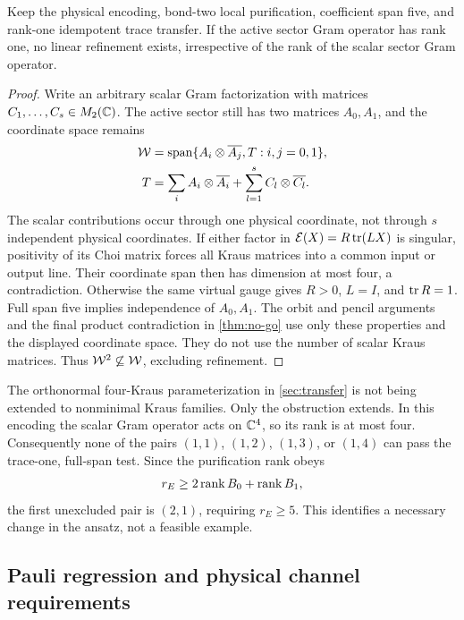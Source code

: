 \begin{corollary}
	\label{cor:scalar-extension}
	Keep the physical encoding, bond-two local purification, coefficient span
	five, and rank-one idempotent trace transfer. If the active sector Gram
	operator has rank one, no linear refinement exists, irrespective of the
	rank of the scalar sector Gram operator.
\end{corollary}
\begin{proof}
	Write an arbitrary scalar Gram factorization with matrices
	$C_1,\ldots,C_s\in M_2(\mathbb{C})$. The active sector still has two matrices
	$A_0,A_1$, and the coordinate space remains
	\begin{align}
		\mathcal{W} & =\operatorname{span}\{A_i\otimes\overline{A_j},T:i,j=0,1\}, \\
		T     & =\sum_i A_i\otimes\overline{A_i}
		+\sum_{l=1}^{s}C_l\otimes\overline{C_l}.
	\end{align}
	The scalar contributions occur through one physical coordinate, not
	through $s$ independent physical coordinates. If either factor in
	$\mathcal{E}(X)=R\operatorname{tr}(LX)$ is singular, positivity of its Choi matrix forces
	all Kraus matrices into a common input or output line. Their coordinate
	span then has dimension at most four, a contradiction.
	Otherwise the same virtual gauge gives $R>0$, $L=I$, and $\operatorname{tr} R=1$.
	Full span five implies independence of $A_0,A_1$.
	The orbit and pencil arguments and the final product contradiction in
	\cref{thm:no-go} use only these properties and the displayed coordinate
	space. They do not use the number of scalar Kraus matrices.
	Thus $\mathcal{W}^2\not\subseteq\mathcal{W}$, excluding refinement.
\end{proof}

The orthonormal four-Kraus parameterization in \cref{sec:transfer}
is not being extended to nonminimal Kraus families. Only the obstruction
extends. In this encoding the scalar Gram operator acts on $\mathbb{C}^4$, so
its rank is at most four. Consequently none of the pairs $(1,1)$,
$(1,2)$, $(1,3)$, or $(1,4)$ can pass the trace-one, full-span test.
Since the purification rank obeys
\begin{align}
	r_E\geq2\operatorname{rank} B_0+\operatorname{rank} B_1,
\end{align}
the first unexcluded pair is $(2,1)$, requiring $r_E\geq5$.
This identifies a necessary change in the ansatz, not a feasible example.

\subsection{Pauli regression and physical channel requirements}

